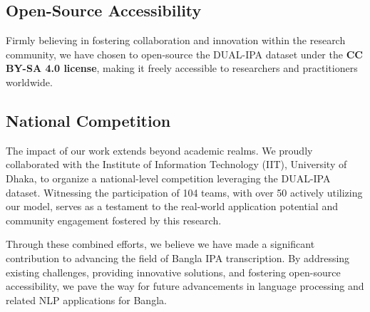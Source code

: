 \subsection{Open-Source Accessibility}

Firmly believing in fostering collaboration and innovation within the research community, we have chosen to open-source the DUAL-IPA dataset under the \textbf{CC BY-SA 4.0 license}, making it freely accessible to researchers and practitioners worldwide.

\subsection{National Competition}

The impact of our work extends beyond academic realms. We proudly collaborated with the Institute of Information Technology (IIT), University of Dhaka, to organize a national-level competition leveraging the DUAL-IPA dataset. Witnessing the participation of 104 teams, with over 50 actively utilizing our model, serves as a testament to the real-world application potential and community engagement fostered by this research.


\hspace{0.5cm}Through these combined efforts, we believe we have made a significant contribution to advancing the field of Bangla IPA transcription. By addressing existing challenges, providing innovative solutions, and fostering open-source accessibility, we pave the way for future advancements in language processing and related NLP applications for Bangla.






